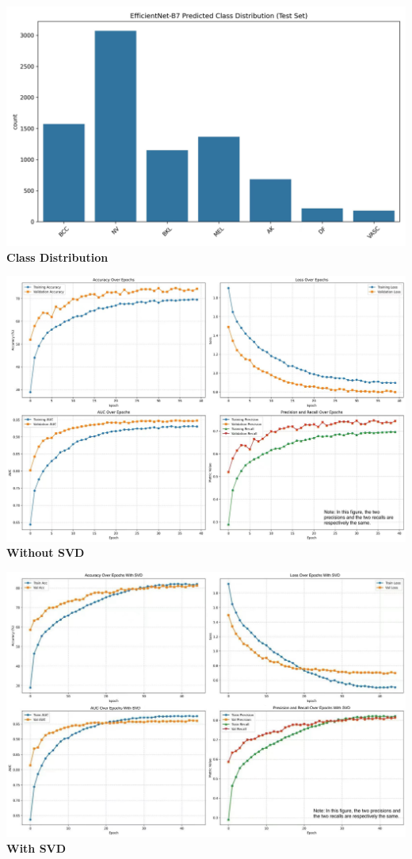 \documentclass[a1paper,portrait,margin=0.8cm]{baposter}
\begin{document}
\begin{poster}
{\begin{minipage}[t]{0.35\textwidth}
        \includegraphics[width=\linewidth]{class distribution.jpg}
        \centering
        \textbf{Class Distribution} 
        
    \end{minipage}
    \hfill 
    \begin{minipage}[t]{0.315\textwidth} 
        
        \includegraphics[width=\linewidth]{without svd.jpg}
        \centering
        \textbf{Without SVD} 
    \end{minipage}
    \hfill
    \begin{minipage}[t]{0.315\textwidth} 
        
        \includegraphics[width=\linewidth]{with svd.jpg}
        \centering
        \textbf{With SVD} 
    \end{minipage}

}
\end{poster}
\end{document}
